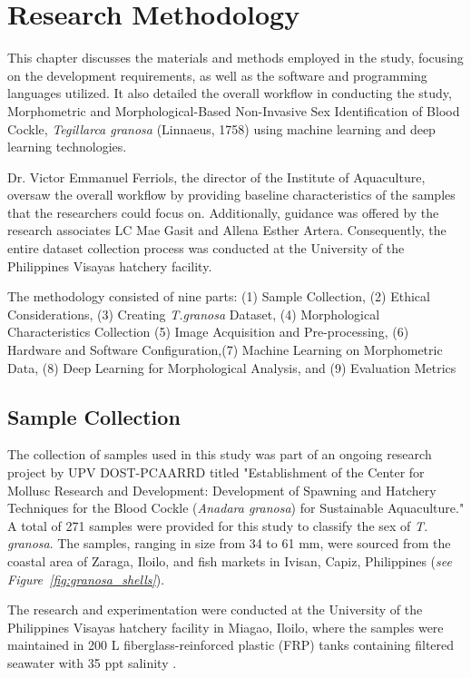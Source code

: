 \chapter{Research Methodology}
\label{sec:methodology}

This chapter discusses the materials and methods employed in the study, focusing on the development requirements, as well as the software and programming languages utilized. It also detailed the overall workflow in conducting the study, Morphometric and Morphological-Based Non-Invasive Sex Identification of Blood Cockle, \textit{Tegillarca granosa} (Linnaeus, 1758) using machine learning and deep learning technologies.

Dr. Victor Emmanuel Ferriols, the director of the Institute of Aquaculture, oversaw the overall workflow by providing baseline characteristics of the samples that the researchers could focus on. Additionally, guidance was offered by the research associates LC Mae Gasit and Allena Esther Artera. Consequently, the entire dataset collection process was conducted at the University of the Philippines Visayas hatchery facility.

The methodology consisted of nine parts: (1) Sample Collection, (2) Ethical Considerations, (3) Creating \textit{T.granosa} Dataset, (4) Morphological Characteristics Collection (5) Image Acquisition and Pre-processing, (6) Hardware and Software Configuration,(7) Machine Learning on Morphometric Data, (8) Deep Learning for Morphological Analysis, and (9) Evaluation Metrics

\section{Sample Collection}
\label{sec:samplecollect} 

The collection of \Tgranosa samples used in this study was part of an ongoing research project by UPV DOST-PCAARRD titled "Establishment of the Center for Mollusc Research and Development: Development of Spawning and Hatchery Techniques for the Blood Cockle (\textit{Anadara granosa}) for Sustainable Aquaculture." A total of 271 samples were provided for this study to classify the sex of \textit{T. granosa}. The samples, ranging in size from 34 to 61 mm, were sourced from the coastal area of Zaraga, Iloilo, and fish markets in Ivisan, Capiz, Philippines (\textit{see Figure~\ref{fig:granosa_shells}}).

The research and experimentation were conducted at the University of the Philippines Visayas hatchery facility in Miagao, Iloilo, where the samples were maintained in 200 L fiberglass-reinforced plastic (FRP) tanks containing filtered seawater with 35 ppt salinity \cite{miranda2023}.

